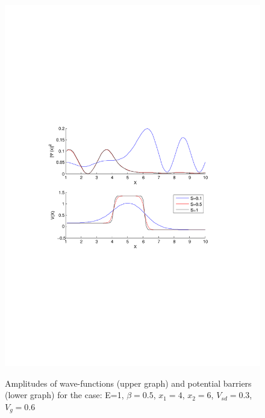 \documentclass[•]{beamer}
\theoremstyle{remark}
\begin{document}
\begin{frame}
\begin{figure}
\centering
\caption{Amplitudes of wave-functions (upper graph) and potential barriers (lower graph) for the case: E=1, $\beta=0.5$, $x_1=4$, $x_2=6$, $V_{sd}=0.3$, $V_g=0.6$}
\includegraphics[scale=0.4, trim = 0mm 20mm 0mm 60mm, clip]{test}
\label{fig:test}
\end{figure}
\end{frame}
\end{document}
